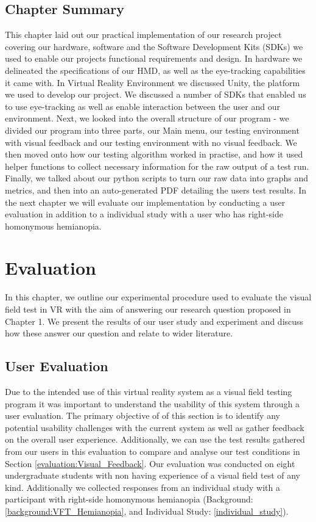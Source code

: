 \documentclass{l4proj}
\begin{document}
\section{Chapter Summary}
This chapter laid out our practical implementation of our research project covering our hardware, software and the Software Development Kits (SDKs) we used to enable our projects functional requirements and design. In hardware we delineated the specifications of our HMD, as well as the eye-tracking capabilities it came with. In Virtual Reality Environment we discussed Unity, the platform we used to develop our project. We discussed a number of SDKs that enabled us to use eye-tracking as well as enable interaction between the user and our environment. Next, we looked into the overall structure of our program - we divided our program into three parts, our Main menu, our testing environment with visual feedback and our testing environment with no visual feedback. We then moved onto how our testing algorithm worked in practise, and how it used helper functions to collect necessary information for the raw output of a test run. Finally, we talked about our python scripts to turn our raw data into graphs and metrics, and then into an auto-generated PDF detailing the users test results. In the next chapter we will evaluate our implementation by conducting a user evaluation in addition to a individual study with a user who has right-side homonymous hemianopia.
\chapter{Evaluation} 
In this chapter, we outline our experimental procedure used to evaluate the visual field test in VR with the aim of answering our research question proposed in Chapter 1. We present the results of our user study and experiment and discuss how these answer our question and relate to wider literature.
\section{User Evaluation}
Due to the intended use of this virtual reality system as a visual field testing program it was important to understand the usability of this system through a user evaluation. The primary objective of of this section is to identify any potential usability challenges with the current system as well as gather feedback on the overall user experience. Additionally, we can use the test results gathered from our users in this evaluation to compare and analyse our test conditions in Section \ref{evaluation:Visual_Feedback}. Our evaluation was conducted on eight undergraduate students with non having experience of a visual field test of any kind. Additionally we collected responses from an individual study with a participant with right-side homonymous hemianopia (Background: \ref{background:VFT_Hemianopia}, and Individual Study: \ref{individual_study}).
\end{document}
